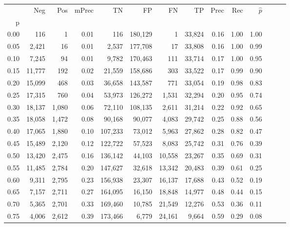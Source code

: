 \begin{tabular}{rrrrrrrrrrrrrr}
\toprule
{} &     Neg &    Pos & mPrec &       TN &       FP &      FN &      TP &  Prec &   Rec & $\hat{p}$ \\
p    &         &        &       &          &          &         &         &       &       &           \\
\midrule
0.00 &     116 &      1 &  0.01 &      116 &  180,129 &       1 &  33,824 &  0.16 &  1.00 &      1.00 \\
0.05 &   2,421 &     16 &  0.01 &    2,537 &  177,708 &      17 &  33,808 &  0.16 &  1.00 &      0.99 \\
0.10 &   7,245 &     94 &  0.01 &    9,782 &  170,463 &     111 &  33,714 &  0.17 &  1.00 &      0.95 \\
0.15 &  11,777 &    192 &  0.02 &   21,559 &  158,686 &     303 &  33,522 &  0.17 &  0.99 &      0.90 \\
0.20 &  15,099 &    468 &  0.03 &   36,658 &  143,587 &     771 &  33,054 &  0.19 &  0.98 &      0.83 \\
0.25 &  17,315 &    760 &  0.04 &   53,973 &  126,272 &   1,531 &  32,294 &  0.20 &  0.95 &      0.74 \\
0.30 &  18,137 &  1,080 &  0.06 &   72,110 &  108,135 &   2,611 &  31,214 &  0.22 &  0.92 &      0.65 \\
0.35 &  18,058 &  1,472 &  0.08 &   90,168 &   90,077 &   4,083 &  29,742 &  0.25 &  0.88 &      0.56 \\
0.40 &  17,065 &  1,880 &  0.10 &  107,233 &   73,012 &   5,963 &  27,862 &  0.28 &  0.82 &      0.47 \\
0.45 &  15,489 &  2,120 &  0.12 &  122,722 &   57,523 &   8,083 &  25,742 &  0.31 &  0.76 &      0.39 \\
0.50 &  13,420 &  2,475 &  0.16 &  136,142 &   44,103 &  10,558 &  23,267 &  0.35 &  0.69 &      0.31 \\
0.55 &  11,485 &  2,784 &  0.20 &  147,627 &   32,618 &  13,342 &  20,483 &  0.39 &  0.61 &      0.25 \\
0.60 &   9,311 &  2,795 &  0.23 &  156,938 &   23,307 &  16,137 &  17,688 &  0.43 &  0.52 &      0.19 \\
0.65 &   7,157 &  2,711 &  0.27 &  164,095 &   16,150 &  18,848 &  14,977 &  0.48 &  0.44 &      0.15 \\
0.70 &   5,365 &  2,701 &  0.33 &  169,460 &   10,785 &  21,549 &  12,276 &  0.53 &  0.36 &      0.11 \\
0.75 &   4,006 &  2,612 &  0.39 &  173,466 &    6,779 &  24,161 &   9,664 &  0.59 &  0.29 &      0.08 \\

\end{tabular}
